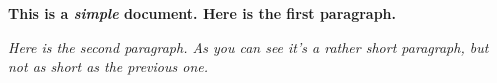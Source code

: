 \documentclass[12pt]{scrartcl}
\begin{document}
{\bfseries \Large
This is a \emph{simple} document.
Here is the first paragraph.
}

{\itshape
Here is the second paragraph. As you
can        see it's 
a rather
\emph{short} paragraph, but not as short as the previous one.
}
\end{document}
